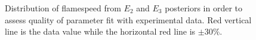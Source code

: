 \begin{figure}[H]
   \caption{Distribution of flamespeed from $E_2$ and $E_3$ posteriors in order to
     assess quality of parameter fit with experimental data. Red
     vertical line is the data value while the horizontal red line is
     $\pm 30\%$.}
 \end{figure}
